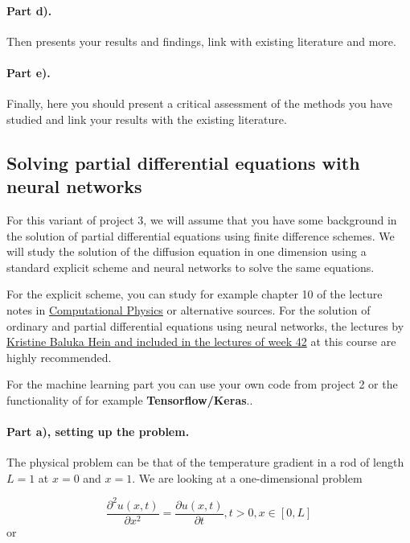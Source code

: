 \documentclass[%
oneside,                 %
final,                   %
10pt]{article}
\begin{document}
\paragraph{Part d).}
Then presents your results and findings, link with existing literature and more.

\paragraph{Part e).}
Finally, here you should present a critical assessment of the methods you have studied and link your results with the existing literature. 

\subsection*{Solving partial differential equations with neural networks}

For this variant of project 3, we will assume that you have some
background in the solution of partial differential equations using
finite difference schemes. We will study the solution of the diffusion
equation in one dimension using a standard explicit scheme and neural
networks to solve the same equations.

For the explicit scheme, you can study for example chapter 10 of the lecture notes in \href{{https://github.com/CompPhysics/ComputationalPhysics/blob/master/doc/Lectures/lectures2015.pdf}}{Computational Physics} or alternative sources. For the solution of ordinary and partial differential equations using neural networks, the lectures by \href{{https://compphysics.github.io/MachineLearning/doc/pub/week42/html/week42.html}}{Kristine Baluka Hein and included in the lectures of week 42} at this course are highly recommended.

For the machine learning part you can use your own code from project 2 or the functionality of for example \textbf{Tensorflow/Keras}.. 

\paragraph{Part a), setting up the problem.}
The physical problem can be that of the temperature gradient in a rod of length $L=1$ at $x=0$ and $x=1$.
We are looking at a one-dimensional
problem

\begin{equation*}
 \frac{\partial^2 u(x,t)}{\partial x^2} =\frac{\partial u(x,t)}{\partial t}, t> 0, x\in [0,L]
\end{equation*}
or
\end{document}
